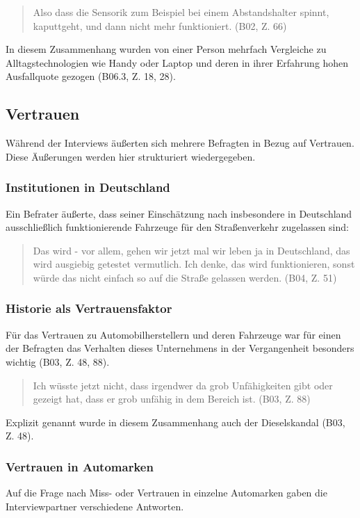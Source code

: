 \documentclass[12pt]{article}
\begin{document}
\begin{quote}
  Also dass die Sensorik zum Beispiel bei einem Abstandshalter spinnt, kaputtgeht, und dann nicht mehr funktioniert. (B02, Z. 66)
\end{quote}

In diesem Zusammenhang wurden von einer Person mehrfach Vergleiche zu Alltagstechnologien wie Handy oder Laptop und deren in ihrer Erfahrung hohen Ausfallquote gezogen (B06.3, Z. 18, 28).


\subsection{Vertrauen}
Während der Interviews äußerten sich mehrere Befragten in Bezug auf Vertrauen. Diese Äußerungen werden hier strukturiert wiedergegeben.

\subsubsection*{Institutionen in Deutschland}
Ein Befrater äußerte, dass seiner Einschätzung nach insbesondere in Deutschland ausschließlich funktionierende Fahrzeuge für den Straßenverkehr zugelassen sind:

\begin{quote}
  Das wird - vor allem, gehen wir jetzt mal wir leben ja in Deutschland, das wird ausgiebig getestet vermutlich. Ich denke, das wird funktionieren, sonst würde das nicht einfach so auf die Straße gelassen werden. (B04, Z. 51)
\end{quote}

\subsubsection*{Historie als Vertrauensfaktor}
Für das Vertrauen zu Automobilherstellern und deren Fahrzeuge war für einen der Befragten das Verhalten dieses Unternehmens in der Vergangenheit besonders wichtig (B03, Z. 48, 88).

\begin{quote}
  Ich wüsste jetzt nicht, dass irgendwer da grob Unfähigkeiten gibt oder gezeigt hat, dass er grob unfähig in dem Bereich ist. (B03, Z. 88)
\end{quote}

Explizit genannt wurde in diesem Zusammenhang auch der Dieselskandal (B03, Z. 48).

\subsubsection*{Vertrauen in Automarken}
Auf die Frage nach Miss- oder Vertrauen in einzelne Automarken gaben die Interviewpartner verschiedene Antworten.
\end{document}
